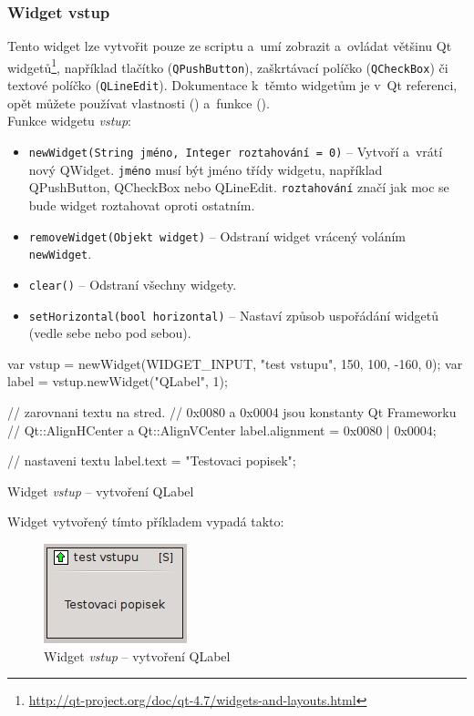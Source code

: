 \documentclass[12pt, a4paper, oneside]{article}
\newcommand{\It}{\textit}  %
\begin{document}
\subsubsection*{Widget vstup}
Tento widget lze vytvořit pouze ze scriptu a~umí zobrazit a~ovládat většinu Qt widgetů\footnote{\url{http://qt-project.org/doc/qt-4.7/widgets-and-layouts.html}}, například tlačítko (\verb/QPushButton/), zaškrtávací políčko (\verb/QCheckBox/) či textové políčko (\verb/QLineEdit/). Dokumentace k~těmto widgetům je v~Qt referenci, opět můžete používat vlastnosti () a~funkce ().\\
Funkce widgetu \It{vstup}:
\begin{itemize}
    \item {\color{blue}\verb/newWidget(String jméno, Integer roztahování = 0)/} -- Vytvoří a~vrátí nový QWidget. \verb/jméno/ musí být jméno třídy widgetu, například QPushButton, QCheckBox nebo QLineEdit. \verb/roztahování/ značí jak moc se bude widget roztahovat oproti ostatním.
    \item {\color{blue}\verb/removeWidget(Objekt widget)/} -- Odstraní widget vrácený voláním \verb|newWidget|.
    \item {\color{blue}\verb/clear()/} -- Odstraní všechny widgety.
    \item {\color{blue}\verb/setHorizontal(bool horizontal)/} -- Nastaví způsob uspořádání widgetů (vedle sebe nebo pod sebou).
\end{itemize}

\begin{listing}[H]
\begin{jscode}
var vstup = newWidget(WIDGET_INPUT,
                "test vstupu", 150, 100, -160, 0);
var label = vstup.newWidget("QLabel", 1);

// zarovnani textu na stred. 
// 0x0080 a 0x0004 jsou konstanty Qt Frameworku 
// Qt::AlignHCenter a Qt::AlignVCenter
label.alignment = 0x0080 | 0x0004;

// nastaveni textu
label.text = "Testovaci popisek";
\end{jscode}
\caption{Widget \It{vstup} -- vytvoření QLabel}
\end{listing}
Widget vytvořený tímto příkladem vypadá takto:

\begin{figure}[H]
\begin{center}
\includegraphics{img/ref_input.png}
\caption{Widget \It{vstup} -- vytvoření QLabel}
\end{center}
\end{figure}
\end{document}
